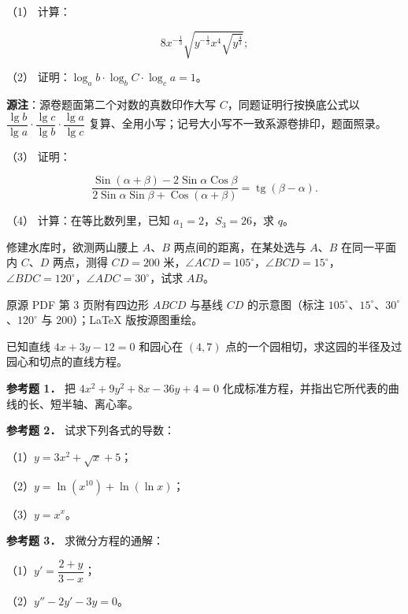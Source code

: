 \begin{question}

（1） 计算：

\nopagebreak[4]
\[
8x^{-\frac13}\sqrt{y^{-\frac13}x^4\sqrt{y^{\frac43}}};
\]

（2） 证明：$\log_a b\cdot\log_b C\cdot\log_c a=1$。

\begin{gktip}
\textbf{源注}：源卷题面第二个对数的真数印作大写 $C$，同题证明行按换底公式以 $\dfrac{\lg b}{\lg a}\cdot\dfrac{\lg c}{\lg b}\cdot\dfrac{\lg a}{\lg c}$ 复算、全用小写；记号大小写不一致系源卷排印，题面照录。
\end{gktip}

（3） 证明：

\nopagebreak[4]
\[
\frac{\operatorname{Sin}(\alpha+\beta)-2\operatorname{Sin}\alpha\operatorname{Cos}\beta}
{2\operatorname{Sin}\alpha\operatorname{Sin}\beta+\operatorname{Cos}(\alpha+\beta)}
=\operatorname{tg}(\beta-\alpha).
\]

（4） 计算：在等比数列里，已知 $a_1=2$，$S_3=26$，求 $q$。

\Needspace{0.4\textheight}
\end{question}
\begin{question}
修建水库时，欲测两山腰上 $A\text{、}B$ 两点间的距离，在某处选与 $A\text{、}B$ 在同一平面内 $C\text{、}D$ 两点，测得 $CD=200$ 米，$\angle ACD=105^\circ$，$\angle BCD=15^\circ$，$\angle BDC=120^\circ$，$\angle ADC=30^\circ$，试求 $AB$。

\begin{gktip}
原源 PDF 第 3 页附有四边形 $ABCD$ 与基线 $CD$ 的示意图（标注 $105^\circ$、$15^\circ$、$30^\circ$、$120^\circ$ 与 $200$）；LaTeX 版按源图重绘。
\end{gktip}
\nopagebreak[4]
\begin{center}\end{center}
\nopagebreak[4]
\end{question}
\begin{question}
已知直线 $4x+3y-12=0$ 和园心在 $(4,7)$ 点的一个园相切，求这园的半径及过园心和切点的直线方程。

\textbf{参考题 1．} 把 $4x^2+9y^2+8x-36y+4=0$ 化成标准方程，并指出它所代表的曲线的长、短半轴、离心率。

\textbf{参考题 2．} 试求下列各式的导数：

（1）$y=3x^2+\sqrt{x}+5$；

（2）$y=\ln(x^{10})+\ln(\ln x)$；

（3）$y=x^x$。

\textbf{参考题 3．} 求微分方程的通解：

（1）$y'=\dfrac{2+y}{3-x}$；

（2）$y''-2y'-3y=0$。

\end{question}